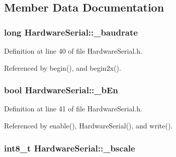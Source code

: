 \subsection{Member Data Documentation}
\hypertarget{class_hardware_serial_ae692ab4a0a8aad73c74a10066fa9da24}{
\subsubsection[{\_\-baudrate}]{\setlength{\rightskip}{0pt plus 5cm}long {\bf HardwareSerial::\_\-baudrate}}}
\label{class_hardware_serial_ae692ab4a0a8aad73c74a10066fa9da24}


Definition at line 40 of file HardwareSerial.h.



Referenced by begin(), and begin2x().

\hypertarget{class_hardware_serial_a8040fbab1f9197a9935df23a4c5e9a3b}{
\subsubsection[{\_\-bEn}]{\setlength{\rightskip}{0pt plus 5cm}bool {\bf HardwareSerial::\_\-bEn}}}
\label{class_hardware_serial_a8040fbab1f9197a9935df23a4c5e9a3b}


Definition at line 41 of file HardwareSerial.h.



Referenced by enable(), HardwareSerial(), and write().

\hypertarget{class_hardware_serial_a37dd406c01fd6432618925f0aeb329f3}{
\subsubsection[{\_\-bscale}]{\setlength{\rightskip}{0pt plus 5cm}int8\_\-t {\bf HardwareSerial::\_\-bscale}}}
\label{class_hardware_serial_a37dd406c01fd6432618925f0aeb329f3}


